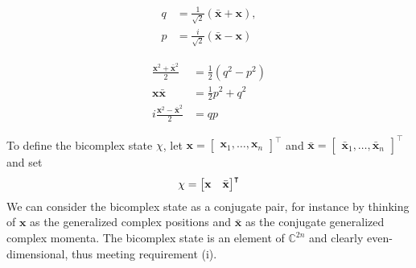 \documentclass{article}
\begin{document}
 \begin{align}
\label{eq: q}
    q &= \frac{1}{\sqrt{2}}(\bar{\textbf{x}}+\textbf{x}),\\
\label{eq: p}    
    p &= \frac{i}{\sqrt{2}}(\bar{\textbf{x}}-\textbf{x})
\end{align}

\begin{align}
    \frac{\textbf{x}^2+\bar{\textbf{x}}^2}{2} &= \frac{1}{2}(q^2-p^2)\\
    \textbf{x}\bar{\textbf{x}} &=\frac{1}{2} p^2+q^2\\
     i \frac{\textbf{x}^2-\bar{\textbf{x}}^2}{2} &= qp
\end{align}


\begin{comment}
Here $\omega=\sqrt{1/IC}$ is the generalized natural frequency, $I$ is the generalized inertance, and $C$ is the generalized compliance.
Some domain specific examples of inertances and compliances are listed in Table \ref{tb:elements}.
\begin{table}[h]
\caption{{\small Elements}}
\label{tb:elements}
\begin{center}
\begin{tabular}{lll}
\hline
\textbf{Generalized} & \textbf{Mechanical} & \textbf{Electrical} \\ \hline
Compliance, $C$      & Spring, $1/k$       & Capacitor, $C$      \\
Inertance, $I$       & Mass, $m$           & Inductor, $L$       \\
Resistance, $r$      & Damper, $b$         & Resistor, $R$       \\ \hline
\end{tabular}
\end{center}
\end{table}
\end{comment}















To define the bicomplex state $\chi$, let
 $\textbf{x} =\begin{bmatrix}
\textbf{x}_1,\dots,\textbf{x}_n
\end{bmatrix}^\intercal$ and $\bar{\textbf{x}} =\begin{bmatrix}
\bar{\textbf{x}}_1,\dots,\bar{\textbf{x}}_n
\end{bmatrix}^\intercal$ and set 
\begin{equation}
\label{eq: state}
    \chi = \begin{bmatrix}
    \textbf{x}& \Bar{\textbf{x}}
    \end{bmatrix}^\intercal
\end{equation}
 We can consider the bicomplex state as a conjugate pair, for instance by thinking of $\textbf{x}$ as the generalized complex positions and $\bar{\textbf{x}}$ as the conjugate generalized complex momenta. The bicomplex state is an element of $\mathbb{C}^{2n}$ and clearly even-dimensional, thus meeting requirement (i).
\end{document}
